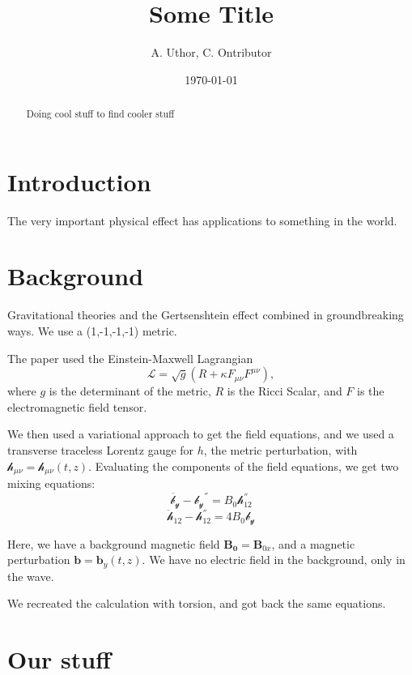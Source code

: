 \documentclass[letterpaper,12pt]{article}
\begin{document}
\title{Some Title}
\author{A. Uthor, C. Ontributor}
\date{\today}
\maketitle

\begin{abstract}
Doing cool stuff to find cooler stuff
\end{abstract}


\section{Introduction}

The very important physical effect has applications to something in the world. 


\section{Background}

Gravitational theories and the Gertsenshtein effect combined in groundbreaking ways.
We use a (1,-1,-1,-1) metric.

The paper used the Einstein-Maxwell Lagrangian
\begin{equation}
\mathcal{L}=\sqrt{g}(R+\kappa F_{\mu \nu}F^{\mu \nu}),
\end{equation}
where $g$ is the determinant of the metric, $R$ is the Ricci Scalar, and $F$ is the electromagnetic field tensor. 

We then used a variational approach to get the field equations, and we used a transverse traceless Lorentz gauge for $h$, the metric perturbation, with $\mathcal{h}_{\mu \nu}=\mathcal{h}_{\mu \nu}(t,z)$. Evaluating the components of the field equations, we get two mixing equations:
\begin{equation}
\ddot{ \mathcal{b_y}} - \mathcal{b_y}^{''}=B_0\mathcal{h}^{''}_{12}
\end{equation}
\begin{equation}
\ddot{ \mathcal{h}}_{12} - \mathcal{h}^{''}_{12}=4B_0 \mathcal{b_y}
\end{equation}

Here, we have a background magnetic field $\mathbf{B_0}=\mathbf{B}_{0x}$, and a magnetic perturbation $\mathbf{b}=\mathbf{b}_y (t,z)$. We have no electric field in the background, only in the wave.

We recreated the calculation with torsion, and got back the same equations.
\section{Our stuff}
\end{document}
